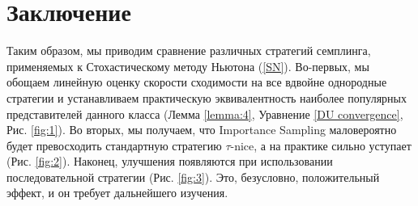 \documentclass{article}
\theoremstyle{definition}
\theoremstyle{assumption}
\theoremstyle{lemma}
\theoremstyle{theorem}
\theoremstyle{proposition}
\begin{document}
	\section{Заключение}
	Таким образом, мы приводим сравнение различных стратегий семплинга, применяемых к Стохастическому методу Ньютона (\ref{SN}). Во-первых, мы обощаем линейную оценку скорости сходимости на все вдвойне однородные стратегии и устанавливаем практическую эквивалентность наиболее популярных представителей данного класса (Лемма \ref{lemma:4}, Уравнение \ref{DU convergence}, Рис. \ref{fig:1}). Во вторых, мы получаем, что Importance Sampling маловероятно будет превосходить стандартную стратегию $\tau$-nice, а на практике сильно уступает (Рис. \ref{fig:2}). Наконец, улучшения появляются при использовании последовательной стратегии (Рис. \ref{fig:3}). Это, безусловно, положительный эффект, и он требует дальнейшего изучения.
	
	
	\renewcommand\refname{References}	
	
	
	
\end{document}

